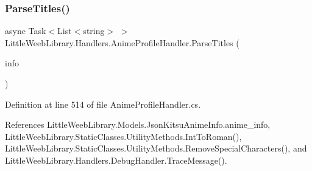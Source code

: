 \mbox{\label{class_little_weeb_library_1_1_handlers_1_1_anime_profile_handler_a4796da2a058bbc1efe2ee8f31b6a9b4d}} 
\subsubsection{\texorpdfstring{Parse\+Titles()}{ParseTitles()}}
{\footnotesize\ttfamily async Task$<$List$<$string$>$ $>$ Little\+Weeb\+Library.\+Handlers.\+Anime\+Profile\+Handler.\+Parse\+Titles (\begin{DoxyParamCaption}\item[{\mbox{\hyperlink{class_little_weeb_library_1_1_models_1_1_json_kitsu_anime_info}{Json\+Kitsu\+Anime\+Info}}}]{info }\end{DoxyParamCaption})\hspace{0.3cm}{\ttfamily [private]}}



Definition at line 514 of file Anime\+Profile\+Handler.\+cs.



References Little\+Weeb\+Library.\+Models.\+Json\+Kitsu\+Anime\+Info.\+anime\+\_\+info, Little\+Weeb\+Library.\+Static\+Classes.\+Utility\+Methods.\+Int\+To\+Roman(), Little\+Weeb\+Library.\+Static\+Classes.\+Utility\+Methods.\+Remove\+Special\+Characters(), and Little\+Weeb\+Library.\+Handlers.\+Debug\+Handler.\+Trace\+Message().


